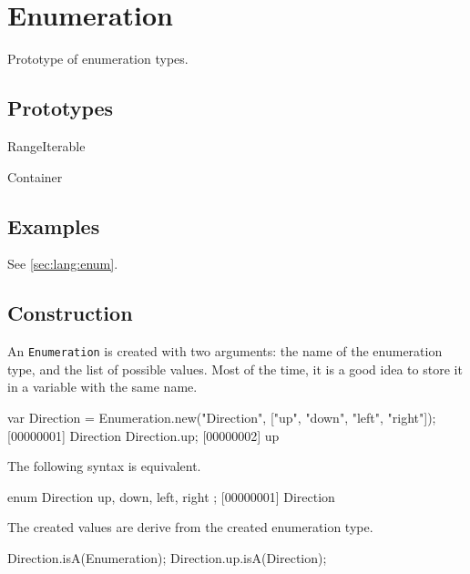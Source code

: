 
\section{Enumeration}

Prototype of enumeration types.

\subsection{Prototypes}
\begin{refObjects}
\item[RangeIterable]
\item[Container]
\end{refObjects}

\subsection{Examples}

See \autoref{sec:lang:enum}.

\subsection{Construction}

An \lstinline{Enumeration} is created with two arguments: the name of the
enumeration type, and the list of possible values.  Most of the time, it is
a good idea to store it in a variable with the same name.

\begin{urbiscript}[firstnumber=1]
var Direction = Enumeration.new("Direction", ["up", "down", "left", "right"]);
[00000001] Direction
Direction.up;
[00000002] up
\end{urbiscript}

The following syntax is equivalent.

\begin{urbiunchecked}
enum Direction
{
  up,
  down,
  left,
  right
};
[00000001] Direction
\end{urbiunchecked}

The created values are derive from the created enumeration type.

\begin{urbiassert}
Direction.isA(Enumeration);
Direction.up.isA(Direction);
\end{urbiassert}


